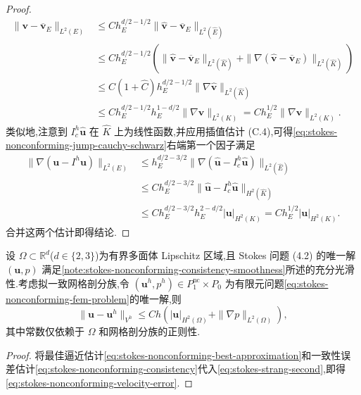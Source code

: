 \begin{proof}
\[
\begin{aligned}
  \|\bm{v}-\overline{\bm{v}}_E\|_{L^2(E)}
  &\leq Ch_E^{d/2-1/2}
       \|\widehat{\bm{v}}-\overline{\bm{v}}_E\|_{L^2(\widehat E)}\\
  &\leq Ch_E^{d/2-1/2}
       \left(\|\widehat{\bm{v}}-\overline{\bm{v}}_E\|_{L^2(\widehat K)}
       +\|\nabla(\widehat{\bm{v}}-\overline{\bm{v}}_E)\|_{L^2(\widehat K)}\right)\\
  &\leq C(1+\widehat C)h_E^{d/2-1/2}
       \|\nabla\widehat{\bm{v}}\|_{L^2(\widehat K)}\\
  &\leq Ch_E^{d/2-1/2}h_E^{1-d/2}
       \|\nabla\bm{v}\|_{L^2(K)}
   =Ch_E^{1/2}\|\nabla\bm{v}\|_{L^2(K)}.
\end{aligned}
\]
类似地,注意到 $I_c^h\widehat{\bm{u}}$ 在 $\widehat K$ 上为线性函数,并应用插值估计 (C.4),可得\cref{eq:stokes-nonconforming-jump-cauchy-schwarz}右端第一个因子满足
\[
\begin{aligned}
  \|\nabla(\bm{u}-I^h\bm{u})\|_{L^2(E)}
  &\leq h_E^{d/2-3/2}
       \|\nabla(\widehat{\bm{u}}-I_c^h\widehat{\bm{u}})\|_{L^2(\widehat E)}\\
  &\leq Ch_E^{d/2-3/2}
       \|\widehat{\bm{u}}-I_c^h\widehat{\bm{u}}\|_{H^2(\widehat K)}\\
  &\leq Ch_E^{d/2-3/2}h_E^{2-d/2}|\bm{u}|_{H^2(K)}
   =Ch_E^{1/2}|\bm{u}|_{H^2(K)}.
\end{aligned}
\]
合并这两个估计即得结论.
\end{proof}

\begin{theorem}[速度 $V^h$ 范数误差估计]\label{thm:stokes-nonconforming-velocity-error}
设 $\Omega\subset\mathbb{R}^d$($d\in\{2,3\}$)为有界多面体 Lipschitz 区域,且 Stokes 问题 (4.2) 的唯一解 $(\bm{u},p)$ 满足\cref{note:stokes-nonconforming-consistency-smoothness}所述的充分光滑性.考虑拟一致网格剖分族,令 $(\bm{u}^h,p^h)\in P_1^{\mathrm{nc}}\times P_0$ 为有限元问题\cref{eq:stokes-nonconforming-fem-problem}的唯一解,则
\begin{equation}\label{eq:stokes-nonconforming-velocity-error}
  \|\bm{u}-\bm{u}^h\|_{V^h}
  \leq Ch\left(|\bm{u}|_{H^2(\Omega)}
       +\|\nabla p\|_{L^2(\Omega)}\right),
\end{equation}
其中常数仅依赖于 $\Omega$ 和网格剖分族的正则性.
\end{theorem}
\begin{proof}
将最佳逼近估计\cref{eq:stokes-nonconforming-best-approximation}和一致性误差估计\cref{eq:stokes-nonconforming-consistency}代入\cref{eq:stokes-strang-second},即得\cref{eq:stokes-nonconforming-velocity-error}.
\end{proof}

